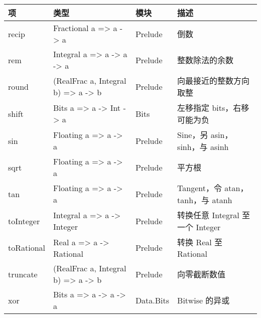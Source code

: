 \documentclass[./main.tex]{subfiles}
\begin{document}
\begin{center}
  \begin{tabular}{|l|p{6cm}|l|p{3cm}|}
    \hline
    项          & 类型                                 & 模块        & 描述                          \\
    \hline
    recip      & Fractional a => a -> a             & Prelude   & 倒数                          \\
    rem        & Integral a => a -> a -> a          & Prelude   & 整数除法的余数                     \\
    round      & (RealFrac a, Integral b) => a -> b & Prelude   & 向最接近的整数方向取整                 \\
    shift      & Bits a => a -> Int -> a            & Bits      & 左移指定 bits，右移可能为负            \\
    sin        & Floating a => a -> a               & Prelude   & Sine，另 asin，sinh，与 asinh    \\
    sqrt       & Floating a => a -> a               & Prelude   & 平方根                         \\
    tan        & Floating a => a -> a               & Prelude   & Tangent，令 atan，tanh，与 atanh \\
    toInteger  & Integral a => a -> Integer         & Prelude   & 转换任意 Integral 至一个 Integer   \\
    toRational & Real a => a -> Rational            & Prelude   & 转换 Real 至 Rational          \\
    truncate   & (RealFrac a, Integral b) => a -> b & Prelude   & 向零截断数值                      \\
    xor        & Bits a => a -> a -> a              & Data.Bits & Bitwise 的异或                 \\
    \hline
  \end{tabular}
\end{center}

\newblock
\end{document}
